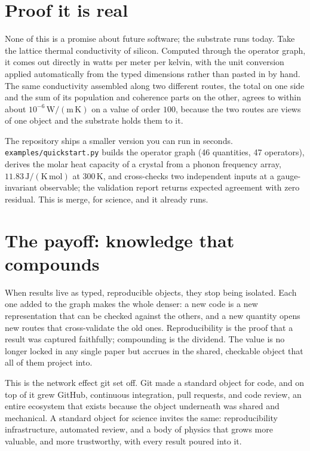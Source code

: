 \documentclass[11pt,a4paper]{article}
\begin{document}
\section{Proof it is real}

None of this is a promise about future software; the substrate runs today. Take
the lattice thermal conductivity of silicon. Computed through the operator graph,
it comes out directly in watts per meter per kelvin, with the unit conversion
applied automatically from the typed dimensions rather than pasted in by hand. The
same conductivity assembled along two different routes, the total on one side and
the sum of its population and coherence parts on the other, agrees to within about
$10^{-6}\,\mathrm{W/(m\,K)}$ on a value of order $100$, because the two routes are
views of one object and the substrate holds them to it.

The repository ships a smaller version you can run in seconds.
\texttt{examples/quickstart.py} builds the operator graph (46 quantities, 47
operators), derives the molar heat capacity of a crystal from a phonon frequency
array, $11.83\,\mathrm{J/(K\,mol)}$ at $300\,\mathrm{K}$, and cross-checks two
independent inputs at a gauge-invariant observable; the validation report returns
expected agreement with zero residual. This is merge, for science, and it already
runs.

\medskip
{}

\section{The payoff: knowledge that compounds}

When results live as typed, reproducible objects, they stop being isolated. Each
one added to the graph makes the whole denser: a new code is a new representation
that can be checked against the others, and a new quantity opens new routes that
cross-validate the old ones. Reproducibility is the proof that a result was
captured faithfully; compounding is the dividend. The value is no longer locked in
any single paper but accrues in the shared, checkable object that all of them
project into.

This is the network effect git set off. Git made a standard object for code, and
on top of it grew GitHub, continuous integration, pull requests, and code review,
an entire ecosystem that exists because the object underneath was shared and
mechanical. A standard object for science invites the same: reproducibility
infrastructure, automated review, and a body of physics that grows more valuable,
and more trustworthy, with every result poured into it.
\end{document}

